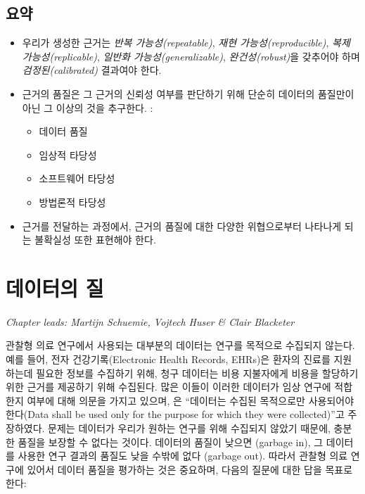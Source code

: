 \documentclass[11pt]{book}
\providecommand{\tightlist}{%
  \setlength{\itemsep}{0pt}\setlength{\parskip}{0pt}}
\theoremstyle{definition}
\theoremstyle{definition}
\theoremstyle{definition}
\theoremstyle{remark}
\let\BeginKnitrBlock\begin \let\EndKnitrBlock\end
\begin{document}
\section{요약}\label{-12}

\BeginKnitrBlock{rmdsummary}
\begin{itemize}
\item
  우리가 생성한 근거는 \emph{반복 가능성(repeatable)}, \emph{재현
  가능성(reproducible)}, \emph{복제 가능성(replicable)}, \emph{일반화
  가능성(generalizable)}, \emph{완건성(robust)}을 갖추어야 하며
  \emph{검정된(calibrated)} 결과여야 한다.
\item
  근거의 품질은 그 근거의 신뢰성 여부를 판단하기 위해 단순히 데이터의
  품질만이 아닌 그 이상의 것을 추구한다. :

  \begin{itemize}
  \tightlist
  \item
    데이터 품질
  \item
    임상적 타당성
  \item
    소프트웨어 타당성
  \item
    방법론적 타당성
  \end{itemize}
\item
  근거를 전달하는 과정에서, 근거의 품질에 대한 다양한 위협으로부터
  나타나게 되는 불확실성 또한 표현해야 한다.
\end{itemize}
\EndKnitrBlock{rmdsummary}

\chapter{데이터의 질}\label{DataQuality}

\emph{Chapter leads: Martijn Schuemie, Vojtech Huser \& Clair Blacketer}

관찰형 의료 연구에서 사용되는 대부분의 데이터는 연구를 목적으로 수집되지
않는다. 예를 들어, 전자 건강기록(Electronic Health Records, EHRs)은
환자의 진료를 지원하는데 필요한 정보를 수집하기 위해, 청구 데이터는 비용
지불자에게 비용을 할당하기 위한 근거를 제공하기 위해 수집된다. 많은
이들이 이러한 데이터가 임상 연구에 적합한지 여부에 대해 의문을 가지고
있으며, \citet{vanDerLei_1991} 은 ``데이터는 수집된 목적으로만
사용되어야 한다(Data shall be used only for the purpose for which they
were collected)''고 주장하였다. 문제는 데이터가 우리가 원하는 연구를
위해 수집되지 않았기 때문에, 충분한 품질을 보장할 수 없다는 것이다.
데이터의 품질이 낮으면 (garbage in), 그 데이터를 사용한 연구 결과의
품질도 낮을 수밖에 없다 (garbage out). 따라서 관찰형 의료 연구에 있어서
데이터 품질을 평가하는 것은 중요하며, 다음의 질문에 대한 답을 목표로
한다:
\end{document}
